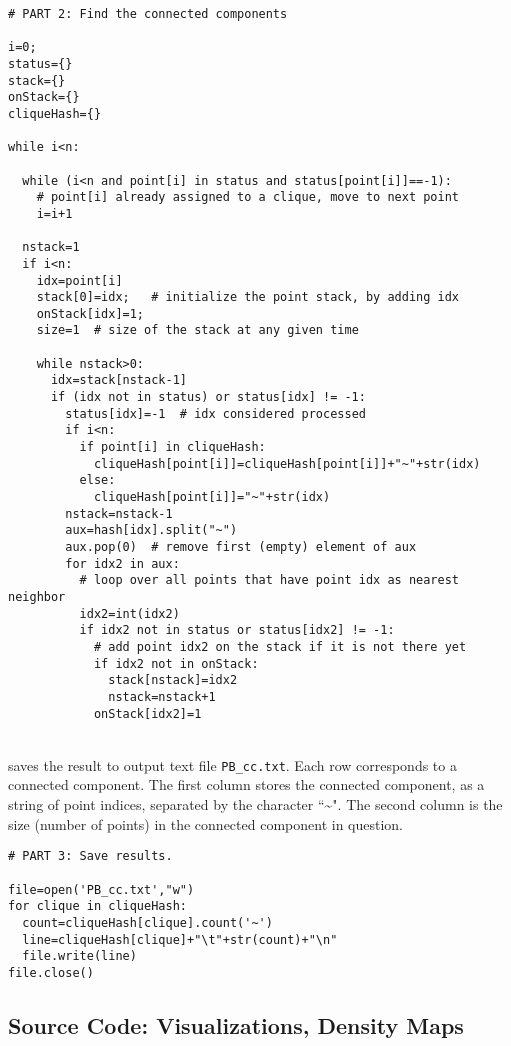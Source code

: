 \documentclass[10pt]{article}
\begin{document}
\begin{lstlisting}
# PART 2: Find the connected components

i=0;
status={}
stack={}
onStack={}
cliqueHash={}

while i<n:

  while (i<n and point[i] in status and status[point[i]]==-1):
    # point[i] already assigned to a clique, move to next point
    i=i+1

  nstack=1
  if i<n:
    idx=point[i]
    stack[0]=idx;   # initialize the point stack, by adding idx
    onStack[idx]=1;
    size=1  # size of the stack at any given time

    while nstack>0:
      idx=stack[nstack-1]
      if (idx not in status) or status[idx] != -1:
        status[idx]=-1  # idx considered processed
        if i<n:
          if point[i] in cliqueHash:
            cliqueHash[point[i]]=cliqueHash[point[i]]+"~"+str(idx)
          else:
            cliqueHash[point[i]]="~"+str(idx)
        nstack=nstack-1
        aux=hash[idx].split("~")
        aux.pop(0)  # remove first (empty) element of aux
        for idx2 in aux:
          # loop over all points that have point idx as nearest neighbor
          idx2=int(idx2)
          if idx2 not in status or status[idx2] != -1:
            # add point idx2 on the stack if it is not there yet
            if idx2 not in onStack:
              stack[nstack]=idx2
              nstack=nstack+1
            onStack[idx2]=1
\end{lstlisting}
\quad \\
 saves the result to output text file \texttt{PB\_cc.txt}. Each row corresponds to a connected component. The
first column stores the connected component, as a string of point indices, separated by the character ``\textasciitilde". The second column is the size (number of points)
in the connected component in question.

\begin{lstlisting}
# PART 3: Save results.

file=open('PB_cc.txt',"w")
for clique in cliqueHash:
  count=cliqueHash[clique].count('~')
  line=cliqueHash[clique]+"\t"+str(count)+"\n"
  file.write(line)
file.close()
\end{lstlisting}

\subsection{Source Code: Visualizations, Density Maps}\label{visusc}
\end{document}

